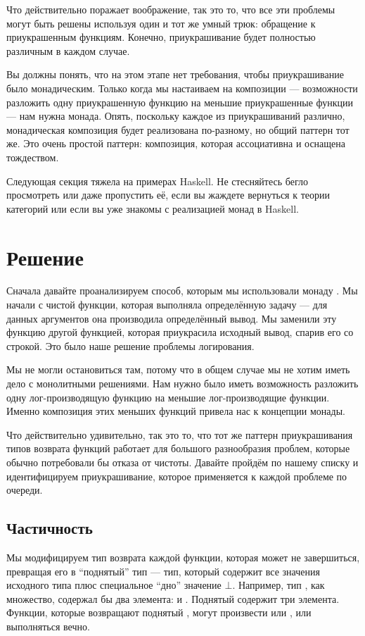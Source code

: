 Что действительно поражает воображение, так это то, что все эти проблемы могут быть решены
используя один и тот же умный трюк: обращение к приукрашенным функциям.
Конечно, приукрашивание будет полностью различным в каждом случае.

Вы должны понять, что на этом этапе нет требования, чтобы
приукрашивание было монадическим. Только когда мы настаиваем на композиции
--- возможности разложить одну приукрашенную функцию на меньшие
приукрашенные функции --- нам нужна монада. Опять, поскольку каждое из
приукрашиваний различно, монадическая композиция будет реализована
по-разному, но общий паттерн тот же. Это очень простой
паттерн: композиция, которая ассоциативна и оснащена тождеством.

Следующая секция тяжела на примерах Haskell. Не стесняйтесь бегло просмотреть или даже
пропустить её, если вы жаждете вернуться к теории категорий или если вы
уже знакомы с реализацией монад в Haskell.

\section{Решение}

Сначала давайте проанализируем способ, которым мы использовали монаду . Мы
начали с чистой функции, которая выполняла определённую задачу --- для данных
аргументов она производила определённый вывод. Мы заменили эту функцию
другой функцией, которая приукрасила исходный вывод, спарив его со
строкой. Это было наше решение проблемы логирования.

Мы не могли остановиться там, потому что в общем случае мы не хотим иметь дело с
монолитными решениями. Нам нужно было иметь возможность разложить одну
лог-производящую функцию на меньшие лог-производящие функции. Именно
композиция этих меньших функций привела нас к концепции
монады.

Что действительно удивительно, так это то, что тот же паттерн приукрашивания
типов возврата функций работает для большого разнообразия проблем, которые
обычно потребовали бы отказа от чистоты. Давайте пройдём по нашему списку и
идентифицируем приукрашивание, которое применяется к каждой проблеме по очереди.

\subsection{Частичность}

Мы модифицируем тип возврата каждой функции, которая может не завершиться,
превращая его в ``поднятый'' тип --- тип, который содержит все значения
исходного типа плюс специальное ``дно'' значение $\bot$. Например,
тип , как множество, содержал бы два элемента:
 и . Поднятый  содержит
три элемента. Функции, которые возвращают поднятый , могут
произвести  или , или выполняться вечно.

